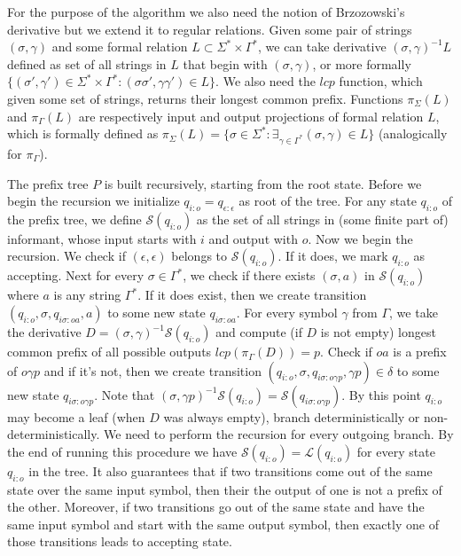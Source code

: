 For the purpose of the algorithm we also need the notion of Brzozowski's derivative but we extend it to regular relations. Given some pair of strings $(\sigma,\gamma)$ and some formal relation $L \subset \Sigma^* \times \Gamma^*$, we can take derivative $(\sigma,\gamma)^{-1}L$ defined as set of all strings in $L$ that begin with $(\sigma,\gamma)$, or more formally $\{(\sigma',\gamma') \in \Sigma^* \times \Gamma^* : (\sigma\sigma',\gamma\gamma') \in L \}$. We also need the $lcp$ function, which given some set of strings, returns their longest common prefix. Functions $\pi_\Sigma(L)$ and $\pi_\Gamma(L)$ are respectively input and output projections of formal relation $L$, which is formally defined as $\pi_\Sigma(L)=\{\sigma\in\Sigma^* : \exists_{\gamma\in\Gamma^*} (\sigma,\gamma)\in L \}$ (analogically for $\pi_\Gamma$).

The prefix tree $P$ is built recursively, starting from the root state. Before we begin the recursion we initialize $q_{i:o}=q_{\epsilon:\epsilon}$ as root of the tree. For any state $q_{i:o}$ of the prefix tree, we define $\mathcal{S}(q_{i:o})$ as the set of all strings in (some finite part of) informant, whose input starts with $i$ and output with $o$. Now we begin the recursion. We check if $(\epsilon,\epsilon)$ belongs to $\mathcal{S}(q_{i:o})$. If it does, we mark $q_{i:o}$ as accepting.  Next for every $\sigma\in\Gamma^*$, we check if there exists $(\sigma,a)$ in $\mathcal{S}(q_{i:o})$ where $a$ is any string $\Gamma^*$. If it does exist, then we create transition $(q_{i:o},\sigma,q_{i\sigma:oa},a)$ to some new state $q_{i\sigma:oa}$. For every symbol $\gamma$ from $\Gamma$, we take the derivative $D = (\sigma,\gamma)^{-1}\mathcal{S}(q_{i:o})$ and compute (if $D$ is not empty) longest common prefix of all possible outputs $lcp(\pi_\Gamma(D))=p$. Check if $oa$ is a prefix of $o\gamma p$ and if it's not, then we create transition $(q_{i:o},\sigma,q_{i\sigma:o\gamma p},\gamma p)\in\delta$ to some new state $q_{i\sigma:o\gamma p}$.  Note that $(\sigma,\gamma p)^{-1}\mathcal{S}(q_{i:o})=\mathcal{S}(q_{i\sigma:o\gamma p})$. By this point  $q_{i:o}$ may become a leaf (when $D$ was always empty), branch deterministically or non-deterministically. We need to perform the recursion for every outgoing branch. By the end of running this procedure we have $\mathcal{S}(q_{i:o})=\mathcal{L}(q_{i:o})$ for every state $q_{i:o}$ in the tree. It also guarantees that if two transitions come out of the same state over the same input symbol, then their the output of one is not a prefix of the other.  Moreover, if two transitions go out of the same state and have the same input symbol and start with the same output symbol, then exactly one of those transitions leads to accepting state.


